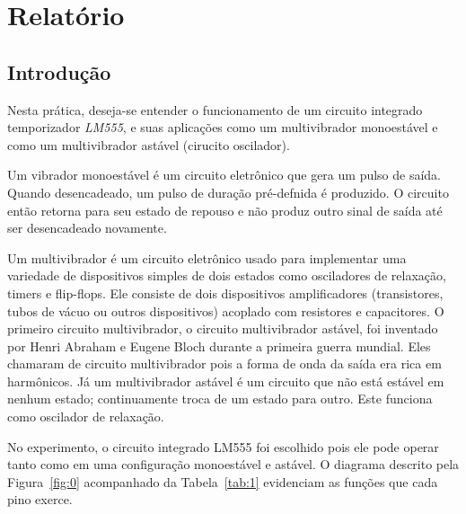 \documentclass[12pt,a4paper]{article}
\begin{document}
\setcounter{figure}{2}
\setcounter{section}{3}
\setcounter{page}{4}
\section{Relatório}
\subsection{Introdução}

Nesta prática, deseja-se entender o funcionamento de um circuito integrado temporizador \emph{LM555}, e suas aplicações como um multivibrador monoestável e como um multivibrador astável (cirucito oscilador). 

Um vibrador monoestável é um circuito eletrônico que gera um pulso de saída. Quando desencadeado, um pulso de duração pré-defnida é produzido.
O circuito então retorna para seu estado de repouso e não produz outro sinal de saída até ser desencadeado novamente.

Um multivibrador é um circuito eletrônico usado para implementar uma variedade de dispositivos simples de dois estados como osciladores de relaxação, timers e flip-flops.
Ele consiste de dois dispositivos amplificadores (transistores, tubos de vácuo ou outros dispositivos) acoplado com resistores e capacitores.
O primeiro circuito multivibrador, o circuito multivibrador astável, foi inventado por Henri Abraham e Eugene Bloch durante a primeira guerra mundial. 
Eles chamaram de circuito multivibrador pois a forma de onda da saída era rica em harmônicos. 
Já um multivibrador astável é um circuito que não está estável em nenhum estado; continuamente troca de um estado para outro. Este funciona como oscilador de relaxação.

No experimento, o circuito integrado LM555 foi escolhido pois ele pode operar tanto como em uma configuração monoestável e astável. O diagrama descrito pela Figura~\ref{fig:0} acompanhado da Tabela~\ref{tab:1} evidenciam as funções que cada pino exerce.
\end{document}
